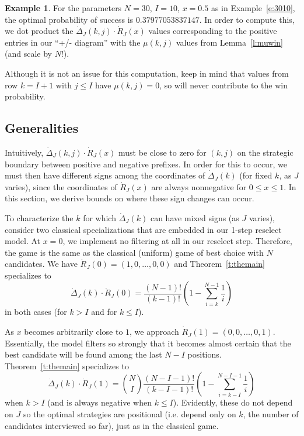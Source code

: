 \documentclass[11pt]{amsart}   %
\theoremstyle{definition}
\newtheorem{example}[theorem]{Example}
\theoremstyle{remark}
\numberwithin{equation}{section}
\theoremstyle{theorem}
\begin{document}
\begin{example}
For the parameters $N = 30$, $I = 10$, $x = 0.5$ as in Example~\ref{e:3010}, the optimal probability of success is $0.37977053837147$.  In order to compute this, we dot product the $\dot\Delta_J(k, j) \cdot \dot{R}_J(x)$ values corresponding to the positive entries in our ``+/- diagram'' with the $\mu(k,j)$ values from Lemma~\ref{l:muwin} (and scale by $N!$).

Although it is not an issue for this computation, keep in mind that values from row $k = I+1$ with $j \leq I$ have $\mu(k,j) = 0$, so will never contribute to the win probability. %
\end{example}


\subsection{Generalities}\label{s:stratbound}

Intuitively, $\dot\Delta_J(k,j) \cdot \dot{R}_J(x)$ must be close to zero for
$(k,j)$ on the strategic boundary between positive and negative prefixes.
In order for this to occur, we must then have different signs among the
coordinates of $\dot\Delta_J(k)$ (for fixed $k$, as $J$ varies), since the
coordinates of $\dot{R}_J(x)$ are always nonnegative for $0 \leq x \leq 1$.  
In this section, we derive bounds on where these sign changes can occur.

To characterize the $k$ for which $\dot\Delta_J(k)$ can have mixed signs (as
$J$ varies), consider two classical specializations that are embedded in our
1-step reselect model.  At $x = 0$, we implement no filtering at all in our
reselect step.  Therefore, the game is the same as the classical (uniform) game
of best choice with $N$ candidates.  We have $\dot{R}_J(0) = (1, 0, \ldots, 0, 0)$
and Theorem~\ref{t:themain} specializes to 
\[ \dot\Delta_J(k) \cdot \dot{R}_J(0) = \frac{(N-1)!}{(k-1)!}  \left( 1-\sum_{i=k}^{N-1} \frac{1}{i} \right) \]
in both cases (for $k > I$ and for $k \leq I$).

As $x$ becomes arbitrarily close to $1$, we approach $\dot{R}_J(1) = (0, 0, \ldots, 0, 1)$.
Essentially, the model filters so strongly that it becomes almost certain that
the best candidate will be found among the last $N-I$ positions.  
Theorem~\ref{t:themain} specializes to 
\[ \dot\Delta_J(k) \cdot \dot{R}_J(1) = {N \choose {I}} \frac{(N-I-1)!}{(k-I-1)!}  \left( 1-\sum_{i=k-I}^{N-I-1} \frac{1}{i} \right) \]
when $k > I$ (and is always negative when $k \leq I$).  Evidently, these do not
depend on $J$ so the optimal strategies are positional (i.e. depend only on
$k$, the number of candidates interviewed so far), just as in the classical
game.
\end{document}
